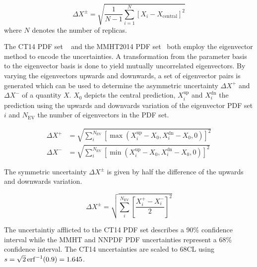 \begin{equation*}
    \Delta X^{\pm} = \sqrt{\frac{1}{N-1} \sum_{i=1}^N \left[ X_{i} - X_{\mathrm{central}} \right]^2}
\end{equation*}
where $N$ denotes the number of replicas.

The CT14 PDF set ~\cite{Dulat:2015mca} and the MMHT2014 PDF set~\cite{Harland-Lang:2014zoa} both
employ the eigenvector method to encode the uncertainties. A transformation from
the parameter basis to the eigenvector basis is done to yield mutually
uncorrelated eigenvectors. By varying the eigenvectors upwards and downwards, a
set of eigenvector pairs is generated which can be used to determine the asymmetric
uncertainty $\Delta X^+$ and $\Delta X^-$ of a quantity $X$. $X_0$ depicts the
central prediction, $X_i^{\mathrm{up}}$ and $X_i^{\mathrm{dn}}$ the prediction
using the upwards and downvards variation of the eigenvector PDF set $i$ and
$N_{\mathrm{EV}}$ the number of eigenvectors in the PDF set.

\begin{equation*}
\begin{aligned}
    \Delta X^+ &= \sqrt{\sum_i^{N_{\mathrm{EV}}} \left[ \max(X_i^{\mathrm{up}}
    -X_0, X_i^{\mathrm{dn}} - X_0, 0)\right]^2}\\
\Delta X^- &= \sqrt{\sum_i^{N_{\mathrm{EV}}} \left[ \min(X_i^{\mathrm{up}} - X_0, X_i^{\mathrm{dn}} - X_0,0)\right]^2}
\end{aligned}
\end{equation*}

The symmetric uncertainty $\Delta X^{\pm}$ is given by half the difference of the upwards and
downwards variation.

\begin{equation*}
    \Delta X^{\pm} = \sqrt{\sum_i^{N_{\mathrm{EV}}} \left[ \frac{X_i^+ -
    X_i^-}{2} \right]^2}
\end{equation*}

The uncertaintiy afflicted to the CT14 PDF set describes a 90\% confidence
interval while the MMHT and NNPDF PDF uncertainties represent a 68\% confidence
interval. The CT14 uncertainties are scaled to 68CL using $s = \sqrt{2}
\operatorname{erf}^{-1}(0.9) = 1.645$.

